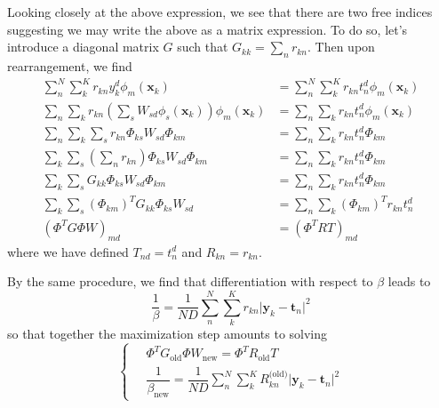 Looking closely at the above expression, we see that there are two free indices suggesting we may write the above as a matrix expression. To do so, let's introduce a diagonal matrix $G$ such that $G_{kk} = \sum_nr_{kn}$. Then upon rearrangement, we find
\begin{align}
  \sum_n^N\sum_k^K r_{kn}y_k^d\phi_m(\mathbf{x}_k) &= \sum_n^N\sum_k^K r_{kn}t_n^d\phi_m(\mathbf{x}_k) \\
  \sum_n\sum_k r_{kn}\left(\sum_sW_{sd}\phi_s(\mathbf{x}_k)\right)\phi_m(\mathbf{x}_k) &= \sum_n\sum_k r_{kn}t_n^d\phi_m(\mathbf{x}_k) \\
  \sum_n\sum_k\sum_s r_{kn}\Phi_{ks}W_{sd}\Phi_{km} &= \sum_n\sum_k r_{kn}t_n^d\Phi_{km} \\
  \sum_k\sum_s \left( \sum_n r_{kn}\right)\Phi_{ks}W_{sd}\Phi_{km} &= \sum_n\sum_k r_{kn}t_n^d\Phi_{km} \\
  \sum_k\sum_s G_{kk}\Phi_{ks}W_{sd}\Phi_{km} &= \sum_n\sum_k r_{kn}t_n^d\Phi_{km} \\
  \sum_k\sum_s (\Phi_{km})^TG_{kk}\Phi_{ks}W_{sd} &= \sum_n\sum_k (\Phi_{km})^Tr_{kn}t_n^d \\
  \left( \Phi^TG\Phi W \right)_{md} &= \left( \Phi^TRT \right)_{md}
\end{align}
where we have defined $T_{nd}=t_n^d$ and $R_{kn} = r_{kn}$.

By the same procedure, we find that differentiation with respect to $\beta$ leads to
\begin{equation}
  \frac{1}{\beta} = \frac{1}{ND}\sum_n^N\sum_k^K r_{kn}\lvert \mathbf{y}_k-\mathbf{t}_n\rvert^2
\end{equation}
so that together the maximization step amounts to solving
\begin{equation}
  \begin{cases}
    \quad \Phi^TG_{\text{old}}\Phi W_{\text{new}} = \Phi^T R_{\text{old}} T \\
    \quad \dfrac{1}{\beta_{\text{new}}} = \dfrac{1}{ND}\sum\limits_n^N\sum\limits_k^KR_{kn}^{\text{(old)}}\lvert \mathbf{y}_k - \mathbf{t}_n \rvert^2
  \end{cases}
\end{equation}







